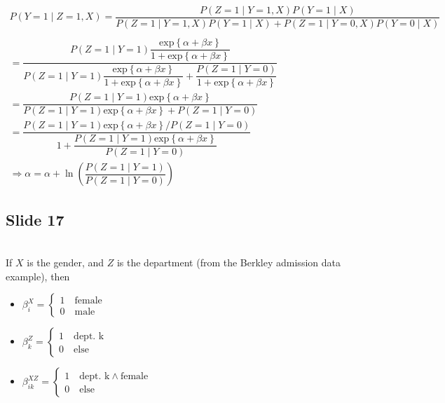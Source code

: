 \begin{equation*}
  \begin{gathered}
    P(Y=1\mid Z=1,X) = \dfrac{P(Z=1\mid Y=1, X)P(Y=1\mid X)}{P(Z=1\mid Y=1,X)P(Y=1\mid X)+P(Z=1\mid Y=0,X)P(Y=0\mid X)}\\\\
    = \dfrac{P(Z=1\mid Y=1)\dfrac{\text{exp}\left\{\alpha+\beta x\right\}}{1+\text{exp}\left\{\alpha+\beta x\right\}}}{P(Z=1\mid Y=1)\dfrac{\text{exp}\left\{\alpha+\beta x\right\}}{1+\text{exp}\left\{\alpha+\beta x\right\}}+\dfrac{P(Z=1\mid Y=0)}{1+\text{exp}\left\{\alpha+\beta x\right\}}}\\
    =\dfrac{P(Z=1\mid Y=1)\text{exp}\left\{\alpha+\beta x\right\}}{P(Z=1\mid Y=1)\text{exp}\left\{\alpha+\beta x\right\}+P(Z=1\mid Y=0)}\\
    =\dfrac{P(Z=1\mid Y=1)\text{exp}\left\{\alpha+\beta x\right\}/P(Z=1\mid Y=0)}{1+\dfrac{P(Z=1\mid Y=1)\text{exp}\left\{\alpha+\beta x\right\}}{P(Z=1\mid Y=0)}}\\
    \Rightarrow \alpha = \alpha + \ln{\left(\dfrac{P(Z=1\mid Y=1)}{P(Z=1\mid Y=0)}\right)}
  \end{gathered}
\end{equation*}\par
\par\bigskip
\subsection{Slide 17}\hfill\\
\noindent If $X$ is the gender, and $Z$ is the department (from the Berkley admission data example), then\par
\begin{itemize}
  \item $\beta_i^X = \begin{cases}1\quad\text{female}\\0\quad\text{male}\end{cases}$
  \item $\beta_k^Z = \begin{cases}1\quad\text{dept. k}\\0\quad\text{else}\end{cases}$
  \item $\beta_{ik}^{XZ} = \begin{cases}1\quad\text{dept. k}\wedge\text{female}\\0\quad\text{else}\end{cases}$
\end{itemize}
\par\bigskip

